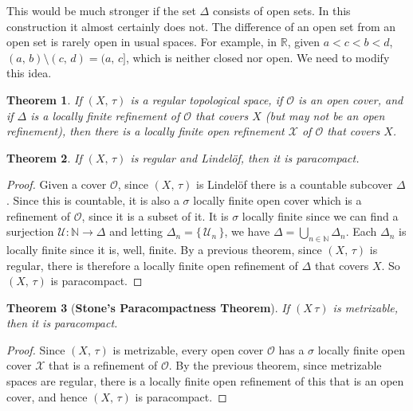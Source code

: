 \documentclass{article}
\theoremstyle{plain}
\newtheorem{theorem}{Theorem}[section]
\theoremstyle{normal}
\begin{document}
        This would be much stronger if the set $\Delta$ consists of open sets.
        In this construction it almost certainly does not. The difference of an
        open set from an open set is rarely open in usual spaces. For example,
        in $\mathbb{R}$, given $a<c<b<d$, $(a,\,b)\setminus(c,\,d)=(a,\,c]$,
        which is neither closed nor open. We need to modify this idea.
        \begin{theorem}
            If $(X,\,\tau)$ is a regular topological space, if
            $\mathcal{O}$ is an open cover, and if $\Delta$ is a locally finite
            refinement of $\mathcal{O}$ that covers $X$ (but may not be an open
            refinement), then there is a locally finite open refinement
            $\mathcal{X}$ of $\mathcal{O}$ that covers $X$.
        \end{theorem}
        \begin{theorem}
            If $(X,\,\tau)$ is regular and Lindel\"{o}f, then it is
            paracompact.
        \end{theorem}
        \begin{proof}
            Given a cover $\mathcal{O}$, since $(X,\,\tau)$ is Lindel\"{o}f
            there is a countable subcover $\Delta$. Since this is countable, it
            is also a $\sigma$ locally finite open cover which is a refinement
            of $\mathcal{O}$, since it is a subset of it. It is $\sigma$
            locally finite since we can find a surjection
            $\mathcal{U}:\mathbb{N}\rightarrow\Delta$ and letting
            $\Delta_{n}=\{\,\mathcal{U}_{n}\,\}$, we have
            $\Delta=\bigcup_{n\in\mathbb{N}}\Delta_{n}$. Each $\Delta_{n}$ is
            locally finite since it is, well, finite. By a previous theorem,
            since $(X,\,\tau)$ is regular, there is therefore a locally finite
            open refinement of $\Delta$ that covers $X$. So $(X,\,\tau)$ is
            paracompact.
        \end{proof}
        \begin{theorem}[\textbf{Stone's Paracompactness Theorem}]
            If $(X\,\tau)$ is metrizable, then it is paracompact.
        \end{theorem}
        \begin{proof}
            Since $(X,\,\tau)$ is metrizable, every open cover $\mathcal{O}$
            has a $\sigma$ locally finite open cover $\mathcal{X}$ that is a
            refinement of $\mathcal{O}$. By the previous theorem, since
            metrizable spaces are regular, there is a locally finite open
            refinement of this that is an open cover, and hence $(X,\,\tau)$
            is paracompact.
        \end{proof}
\end{document}
